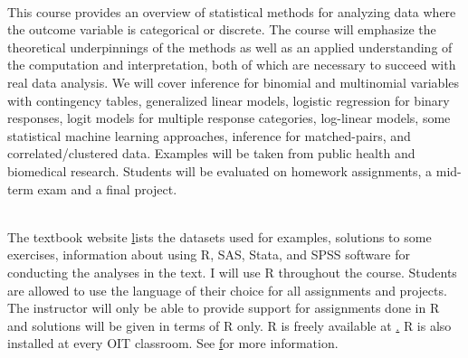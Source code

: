 \documentclass[10pt]{article}
\begin{document}


\bigskip
{}\\
This course provides an overview of statistical methods for analyzing data where the outcome variable is categorical or discrete. The course will emphasize the theoretical underpinnings of the methods as well as an applied understanding of the computation and interpretation, both of which are necessary to succeed with real data analysis. We will cover inference for binomial and multinomial variables with contingency tables, generalized linear models, logistic regression for binary responses, logit models for multiple response categories, log-linear models, some statistical machine learning approaches, inference for matched-pairs, and correlated/clustered data. Examples will be taken from public health and biomedical research. Students will be evaluated on homework assignments, a mid-term exam and a final project.
 


\bigskip
{}\\
The textbook website \href{http://www.stat.ufl.edu/~aa/cda/cda.html} lists the datasets used for examples, solutions to some exercises, information about using R, SAS, Stata, and SPSS software for conducting the analyses in the text. I will use R throughout the course. Students are allowed to use the language of their choice for all assignments and projects. The instructor will only be able to provide support for assignments done in R and solutions will be given in terms of R only. R is freely available at \href{http://cran.r-project.org/}. R is also installed at every OIT classroom. See \href{http://www.umass.edu/statdata/} for more information. 
 
\end{document}
